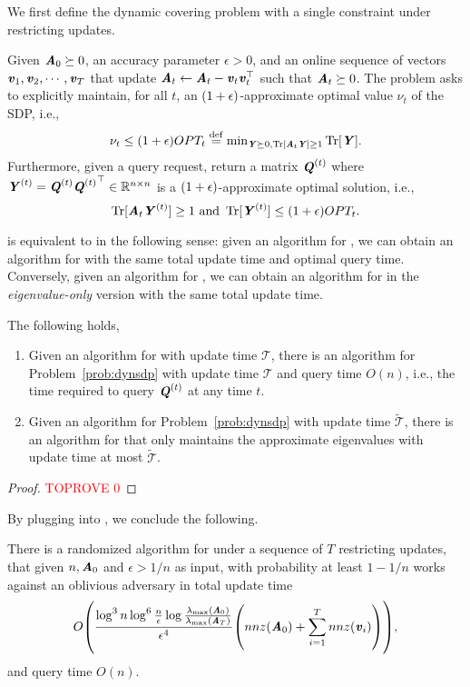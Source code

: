 We first define the dynamic covering problem with a single constraint under restricting updates.

\begin{problem}\label{prob:dynsdp} Given $\AA_0\succeq 0$, an accuracy parameter $\epsilon>0$, and an online sequence of vectors $\vv_1,\vv_2,\cdots,\vv_T$ that update $\AA_t \gets \AA_t -\vv_t\vv_t^{\top}$ such that $\AA_t\succeq 0$. The problem asks to explicitly maintain, for all $t$, an $(1+\eps)$-approximate optimal value $\nu_t$ of the SDP, i.e.,  $$\nu_t \leq (1+\epsilon)OPT_t \defeq {\min}_{\YY\succeq 0, \Tr[\AA_t\YY]\geq 1}  \Tr[\YY].$$
Furthermore, given a query request, return a matrix $\QQ^{(t)}$ where $\YY^{(t)} = \QQ^{(t)}{\QQ^{(t)}}^{\top} \in \mathbb{R}^{n\times n}$ is a $(1+\eps)$-approximate optimal solution, i.e., 
    $$\Tr[\AA_t\YY^{(t)}]\geq 1\text{ and }\Tr[\YY^{(t)}]\leq \left(1+\epsilon\right) OPT_t.$$
\end{problem}
 is equivalent to  in the following sense: given an algorithm for , we can obtain an algorithm for  with the same total update time and optimal query time. Conversely, given an algorithm for , we can obtain an algorithm for  in the \emph{eigenvalue-only} version with the same total update time.

\begin{proposition}\label{prop:equiv sdp}
The following holds,
\begin{enumerate}
    \item Given an algorithm for  with update time $\mathcal{T}$, there is an algorithm for Problem~\ref{prob:dynsdp} with update time 
 $\mathcal{T}$ and query time $O(n)$, i.e., the time required to query $\QQ^{(t)}$ at any time $t$. 
    \item Given an algorithm for Problem~\ref{prob:dynsdp} with update time $\widetilde{\mathcal{T}}$, there is an algorithm for  that only maintains the approximate eigenvalues with update time at most $\widetilde{\mathcal{T}}$.
\end{enumerate}
\end{proposition}
\begin{proof}\textcolor{red}{TOPROVE 0}\end{proof}

By plugging  into , we conclude the following.
\begin{corollary} There is a randomized algorithm for  under a sequence of $T$ restricting updates, that given $n, \AA_0$ and $\epsilon>1/n$ as input, with probability at least $1-1/n$ works against an oblivious adversary in total update time
\[
 O\left(\frac{\log^{3}n \log^6 \frac{n}{\epsilon}\log \frac{\lambda_{\max}(\AA_0)}{\lambda_{\max}(\AA_T)}}{\epsilon^{4}}\left(nnz(\AA_0) + \sum_{i=1}^T nnz(\vv_i)\right) \right),
 \]
and query time $O(n)$.
\end{corollary}